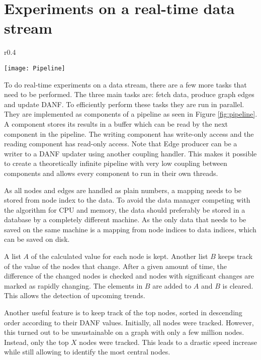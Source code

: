 \section{Experiments on a real-time data stream}

\begin{wrapfigure}{r}{0.4\textwidth}
  \begin{center}
    \texttt{[image: Pipeline]}
  \end{center}
  \caption{Parallel-compatible pipeline layout}
  \label{fig:pipeline}
\end{wrapfigure}

To do real-time experiments on a data stream, there are a few more tasks that need to be performed. The three main tasks are: fetch data, produce graph edges and update DANF. To efficiently perform these tasks they are run in parallel. They are implemented as components of a pipeline as seen in Figure \ref{fig:pipeline}. A component stores its results in a buffer which can be read by the next component in the pipeline. The writing component has write-only access and the reading component has read-only access. Note that Edge producer can be a writer to a DANF updater using another coupling handler. This makes it possible to create a theoretically infinite pipeline with very low coupling between components and allows every component to run in their own threads.

As all nodes and edges are handled as plain numbers, a mapping needs to be stored from node index to the data. To avoid the data manager competing with the algorithm for CPU and memory, the data should preferably be stored in a database by a completely different machine. As the only data that needs to be saved on the same machine is a mapping from node indices to data indices, which can be saved on disk.

A list $A$ of the calculated value for each node is kept. Another list $B$ keeps track of the value of the nodes that change. After a given amount of time, the difference of the changed nodes is checked and nodes with significant changes are marked as rapidly changing. The elements in $B$ are added to $A$ and $B$ is cleared. This allows the detection of upcoming trends. 

Another useful feature is to keep track of the top nodes, sorted in descending order according to their DANF values. Initially, all nodes were tracked. However, this turned out to be unsustainable on a graph with only a few million nodes. Instead, only the top $X$ nodes were tracked. This leads to a drastic speed increase while still allowing to identify the most central nodes. 


